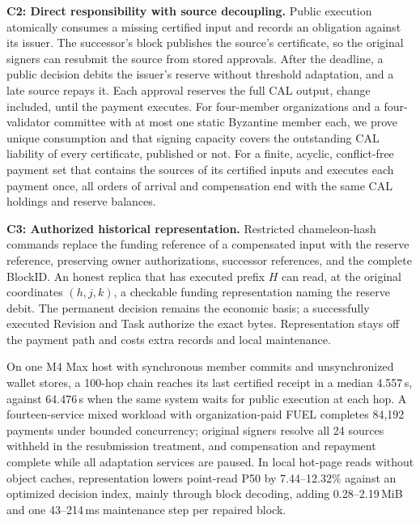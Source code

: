 \noindent\textbf{C2: Direct responsibility with source decoupling.} Public execution atomically consumes a missing certified input and records an obligation against its issuer. The successor's block publishes the source's certificate, so the original signers can resubmit the source from stored approvals. After the deadline, a public decision debits the issuer's reserve without threshold adaptation, and a late source repays it. Each approval reserves the full CAL output, change included, until the payment executes. For four-member organizations and a four-validator committee with at most one static Byzantine member each, we prove unique consumption and that signing capacity covers the outstanding CAL liability of every certificate, published or not. For a finite, acyclic, conflict-free payment set that contains the sources of its certified inputs and executes each payment once, all orders of arrival and compensation end with the same CAL holdings and reserve balances.

\noindent\textbf{C3: Authorized historical representation.} Restricted chameleon-hash commands replace the funding reference of a compensated input with the reserve reference, preserving owner authorizations, successor references, and the complete BlockID. An honest replica that has executed prefix $H$ can read, at the original coordinates $(h,j,k)$, a checkable funding representation naming the reserve debit. The permanent decision remains the economic basis; a successfully executed Revision and Task authorize the exact bytes. Representation stays off the payment path and costs extra records and local maintenance.

On one M4 Max host with synchronous member commits and unsynchronized wallet stores, a 100-hop chain reaches its last certified receipt in a median 4.557\,s, against 64.476\,s when the same system waits for public execution at each hop. A fourteen-service mixed workload with organization-paid FUEL completes 84,192 payments under bounded concurrency; original signers resolve all 24 sources withheld in the resubmission treatment, and compensation and repayment complete while all adaptation services are paused. In local hot-page reads without object caches, representation lowers point-read P50 by 7.44--12.32\% against an optimized decision index, mainly through block decoding, adding 0.28--2.19\,MiB and one 43--214\,ms maintenance step per repaired block.